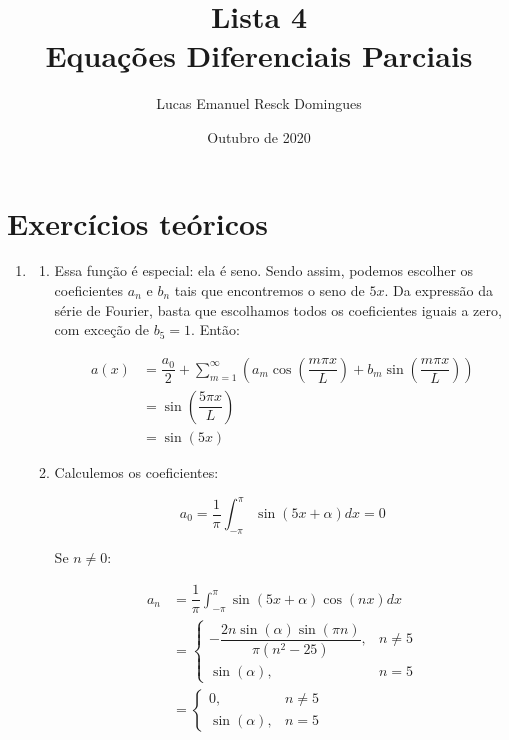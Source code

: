 \documentclass{article}
\title{Lista 4 \\
\large Equações Diferenciais Parciais}
\author{Lucas Emanuel Resck Domingues}
\date{Outubro de 2020}
\begin{document}
    \maketitle
    
    \section*{Exercícios teóricos}

        \begin{enumerate}
            \item            
                \begin{enumerate}
                    \item Essa função é especial: ela é seno.
                        Sendo assim, podemos escolher os coeficientes
                        $a_n$ e $b_n$ tais que encontremos o seno de $5x$.
                        Da expressão da série de Fourier, basta que escolhamos
                        todos os coeficientes iguais a zero, com exceção de $b_5 = 1$.
                        Então:
                        
                        \begin{align*}
                            a(x) &= \dfrac{a_0}{2} + \sum_{m=1}^{\infty} \left(a_m \cos \left(\dfrac{m \pi x}{L}\right) + b_m \sin \left(\dfrac{m \pi x}{L}\right)\right) \\
                            &= \sin \left(\dfrac{5 \pi x}{L}\right) \\
                            &= \sin(5x)
                        \end{align*}

                    \item Calculemos os coeficientes:
                    
                        $$a_0 = \dfrac{1}{\pi} \int_{-\pi}^{\pi} \sin(5x + \alpha) dx = 0$$

                        Se $n \ne 0$:
                        
                        \begin{align*}
                            a_n &= \dfrac{1}{\pi} \int_{-\pi}^{\pi} \sin(5x + \alpha) \cos(nx) dx \\
                            &= \begin{cases}
                                -\dfrac{2n\sin(\alpha)\sin(\pi n)}{\pi(n^2-25)}, & n \ne 5\\
                                \sin(\alpha), & n = 5
                            \end{cases} \\
                            &= \begin{cases}
                                0, & n \ne 5\\
                                \sin(\alpha), & n = 5
                            \end{cases}
                        \end{align*}


\end{enumerate}
\end{enumerate}
\end{document}
